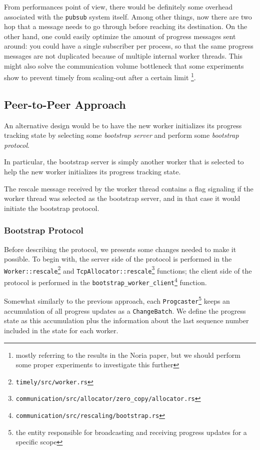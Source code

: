 \documentclass[12pt]{extarticle}
\begin{document}
From performances point of view, there would be definitely some overhead associated with the \verb|pubsub|
system itself. Among other things, now there are two hop that a message needs to go through before reaching
its destination. On the other hand, one could easily optimize the amount of progress messages sent around:
you could have a single subscriber per process, so that the same progress messages are not duplicated
because of multiple internal worker threads. This might also solve the communication volume bottleneck
that some experiments show to prevent timely from scaling-out after a certain limit%
\footnote{mostly referring to the results in the Noria paper, but we should perform some proper experiments to investigate this further}.


\subsection{Peer-to-Peer Approach}

An alternative design would be to have the new worker initializes its progress tracking state
by selecting some \textit{bootstrap server} and perform some \textit{bootstrap protocol}.

In particular, the bootstrap server is simply another worker that is selected to help the
new worker initializes its progress tracking state.

The rescale message received by the worker thread contains a flag signaling if the worker thread
was selected as the bootstrap server, and in that case it would initiate the bootstrap protocol.

\subsubsection{Bootstrap Protocol}

Before describing the protocol, we presents some changes needed to make it possible.
To begin with, the server side of the protocol is performed in the \verb|Worker::rescale|\footnote{\verb|timely/src/worker.rs|}
and \verb|TcpAllocator::rescale|\footnote{\verb|communication/src/allocator/zero_copy/allocator.rs|} functions;
the client side of the protocol is performed in the \verb|bootstrap_worker_client|\footnote{\verb|communication/src/rescaling/bootstrap.rs|} function.

Somewhat similarly to the previous approach, each \verb|Progcaster|\footnote{the entity responsible for broadcasting and receiving progress updates
for a specific scope} keeps an accumulation of all progress updates as a \verb|ChangeBatch|.
We define the progress state as this accumulation plus the information about the last sequence number included in the state for each worker.
\end{document}
